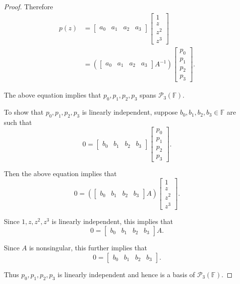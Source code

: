 \begin{proof}
Therefore
\begin{equation*}
\begin{split}
p(z)&=\begin{bmatrix}a_0&a_1&a_2&a_3\end{bmatrix}
\begin{bmatrix}
1\\
z\\
z^2\\
z^3
\end{bmatrix}\\
&=\left(\begin{bmatrix}a_0&a_1&a_2&a_3\end{bmatrix}A^{-1}\right)
\begin{bmatrix}
p_0\\
p_1\\
p_2\\
p_3
\end{bmatrix}.
\end{split}
\end{equation*}

The above equation implies that $p_0,p_1,p_2,p_3$ spans $\mathcal{P}_3(\mathbb{F})$.

To show that $p_0,p_1,p_2,p_3$ is linearly independent, suppose $b_0,b_1,b_2,b_3\in\mathbb{F}$ are such that
\[
0=\begin{bmatrix}b_0&b_1&b_2&b_3\end{bmatrix}
\begin{bmatrix}
p_0\\
p_1\\
p_2\\
p_3
\end{bmatrix}.
\]

Then the above equation implies that\[
0=\left(\begin{bmatrix}b_0&b_1&b_2&b_3\end{bmatrix}
A\right)\begin{bmatrix}
1\\
z\\
z^2\\
z^3
\end{bmatrix}.
\]

Since $1,z,z^2,z^3$ is linearly independent, this implies that\[
0=\begin{bmatrix}b_0&b_1&b_2&b_3\end{bmatrix}A.
\]

Since $A$ is nonsingular, this further implies that\[
0=\begin{bmatrix}b_0&b_1&b_2&b_3\end{bmatrix}.
\]

Thus $p_0,p_1,p_2,p_3$ is linearly independent and hence is a basis of $\mathcal{P}_3(\mathbb{F})$.
\end{proof}

